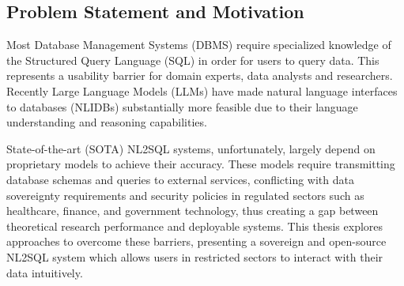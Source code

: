 \subsection{Problem Statement and Motivation}\label{section:introduction:problem}

Most Database Management Systems (DBMS) require specialized knowledge of the
Structured Query Language (SQL) in order for users to query data. This
represents a usability barrier for domain experts, data analysts and
researchers. Recently Large Language Models (LLMs) have made natural language
interfaces to databases (NLIDBs) substantially more feasible due to their
language understanding and reasoning capabilities.

State-of-the-art (SOTA) NL2SQL systems, unfortunately, largely depend on
proprietary models to achieve their accuracy. These models require transmitting
database schemas and queries to external services, conflicting with data
sovereignty requirements and security policies in regulated sectors such as
healthcare, finance, and government technology, thus creating a gap between
theoretical research performance and deployable systems. This thesis explores
approaches to overcome these barriers, presenting a sovereign and open-source
NL2SQL system which allows users in restricted sectors to interact with their
data intuitively.

